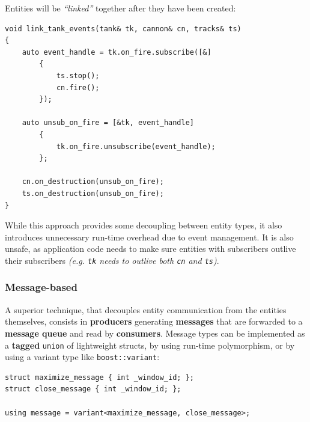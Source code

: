 \documentclass[twoside, 12pt, a4paper, openany]{book}
\begin{document}
Entities will be \emph{``linked''} together after they have been
created:

\begin{verbatim}
void link_tank_events(tank& tk, cannon& cn, tracks& ts)
{
    auto event_handle = tk.on_fire.subscribe([&]
        {
            ts.stop();
            cn.fire();
        });

    auto unsub_on_fire = [&tk, event_handle]
        {
            tk.on_fire.unsubscribe(event_handle);
        };

    cn.on_destruction(unsub_on_fire);
    ts.on_destruction(unsub_on_fire);
}
\end{verbatim}

While this approach provides some decoupling between entity types, it
also introduces unnecessary run-time overhead due to event management.
It is also unsafe, as application code needs to make sure entities with
subscribers outlive their subscribers \emph{(e.g.
\texttt{tk}
needs to outlive both
\texttt{cn}
and
\texttt{ts})}.

\subsubsection{Message-based}\label{message-based}

A superior technique, that decouples entity communication from the
entities themselves, consists in \textbf{producers} generating
\textbf{messages} that are forwarded to a \textbf{message queue} and
read by \textbf{consumers}. Message types can be implemented as a
\textbf{tagged}
\texttt{union}
of lightweight structs, by using run-time polymorphism, or by using a
variant type like
\texttt{boost::variant}:

\begin{verbatim}
struct maximize_message { int _window_id; };
struct close_message { int _window_id; };

using message = variant<maximize_message, close_message>;
\end{verbatim}
\end{document}
